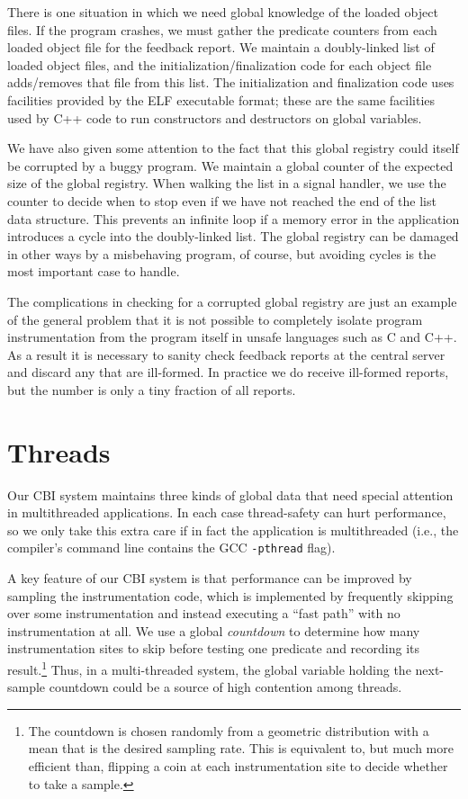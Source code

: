 \documentclass[times,10pt,twocolumn]{article}
\begin{document}
There is one situation in which we need global knowledge of the loaded
object files.  If the program crashes, we must gather
the predicate counters from each loaded object file for the feedback report.
We maintain a doubly-linked list of loaded object files, and the
initialization/finalization code for each object file adds/removes that
file from this list. The initialization and finalization code uses
facilities provided by the ELF executable format; these are the same
facilities used by C++ code to run constructors and destructors on
global variables.

We have also given some attention to the fact that this global
registry could itself be corrupted by a buggy program.  We maintain a
global counter of the expected size of the global registry.  When
walking the list in a signal handler, we use the counter to decide
when to stop even if we have not reached the end of the list data
structure.  This prevents an infinite loop if a memory error in the
application introduces a cycle into the doubly-linked list.  The
global registry can be damaged in other ways by a misbehaving program,
of course, but avoiding cycles is the most important case to handle.

The complications in checking for a corrupted global registry are just
an example of the general problem that it is not possible to
completely isolate program instrumentation from the program itself in
unsafe languages such as C and C++.  As a result it is necessary to
sanity check feedback reports at the central server and discard any
that are ill-formed.  In practice we do receive ill-formed reports,
but the number is only a tiny fraction of all reports.

\section{Threads}

Our CBI system maintains three kinds of global data that 
need special attention in multithreaded
applications.  In each case thread-safety can hurt performance, 
so we only take this extra care if in fact the application is multithreaded
(i.e., the compiler's command line contains the GCC \texttt{-pthread} flag).

A key feature of our CBI system is that performance can be improved by
sampling the instrumentation code, which is implemented by frequently
skipping over some instrumentation and instead executing a ``fast
path'' with no instrumentation at all.  We use a global {\em
countdown} to determine how many instrumentation sites to skip before
testing one predicate and recording its result.\footnote{The countdown
is chosen randomly from a geometric distribution with a mean that is
the desired sampling rate.  This is equivalent to, but much more
efficient than, flipping a coin at each instrumentation site to decide
whether to take a sample.}  Thus, in a multi-threaded system, the
global variable holding the next-sample countdown could be a source of
high contention among threads.
\end{document}
